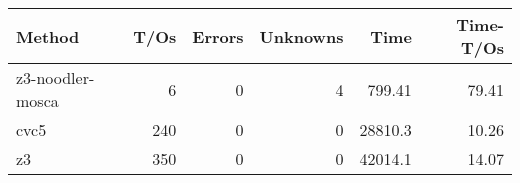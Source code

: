 \begin{tabular}{lrrrrr}
\hline
 Method           &   T/Os &   Errors &   Unknowns &     Time &   Time-T/Os \\
\hline
 z3-noodler-mosca &      6 &        0 &          4 &   799.41 &       79.41 \\
 cvc5             &    240 &        0 &          0 & 28810.3  &       10.26 \\
 z3               &    350 &        0 &          0 & 42014.1  &       14.07 \\
\hline
\end{tabular}
